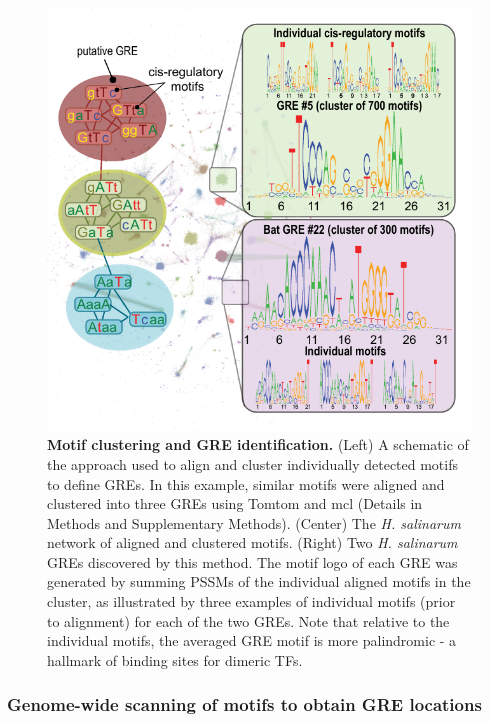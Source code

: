 \begin{figure}[hp]
\centering
\includegraphics[width=0.8\linewidth]{figures/gre_clustering.pdf}
\caption[Motif clustering and GRE identification]{\textbf{Motif clustering and GRE identification.} (Left) A schematic of the approach used to align and cluster individually detected motifs to define GREs. In this example, similar motifs were aligned and clustered into three GREs using Tomtom and mcl (Details in Methods and Supplementary Methods). (Center) The {\it H. salinarum} network of aligned and clustered motifs. (Right) Two {\it H. salinarum} GREs discovered by this method. The motif logo of each GRE was generated by summing PSSMs of the individual aligned motifs in the cluster, as illustrated by three examples of individual motifs (prior to alignment) for each of the two GREs. Note that relative to the individual motifs, the averaged GRE motif is more palindromic - a hallmark of binding sites for dimeric TFs.}
\label{fig:gre_clustering}
\end{figure}

\subsubsection{Genome-wide scanning of motifs to obtain GRE locations}
\label{section:scanning}

